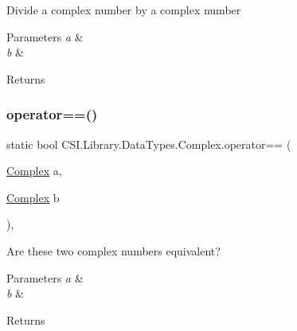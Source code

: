 Divide a complex number by a complex number 


\begin{DoxyParams}{Parameters}
{\em a} & \\
\hline
{\em b} & \\
\hline
\end{DoxyParams}
\begin{DoxyReturn}{Returns}

\end{DoxyReturn}
\mbox{\label{struct_c_s_i_1_1_library_1_1_data_types_1_1_complex_a3fcb1f2dc062c2d039a2905cf322c7c3}} 
\subsubsection{\texorpdfstring{operator==()}{operator==()}}
{\footnotesize\ttfamily static bool C\+S\+I.\+Library.\+Data\+Types.\+Complex.\+operator== (\begin{DoxyParamCaption}\item[{\mbox{\hyperlink{struct_c_s_i_1_1_library_1_1_data_types_1_1_complex}{Complex}}}]{a,  }\item[{\mbox{\hyperlink{struct_c_s_i_1_1_library_1_1_data_types_1_1_complex}{Complex}}}]{b }\end{DoxyParamCaption})\hspace{0.3cm}{\ttfamily [inline]}, {\ttfamily [static]}}



Are these two complex numbers equivalent? 


\begin{DoxyParams}{Parameters}
{\em a} & \\
\hline
{\em b} & \\
\hline
\end{DoxyParams}
\begin{DoxyReturn}{Returns}

\end{DoxyReturn}
\mbox{\label{struct_c_s_i_1_1_library_1_1_data_types_1_1_complex_ad9740140a5ccf87ff113f2b6c1ca87dd}} 
